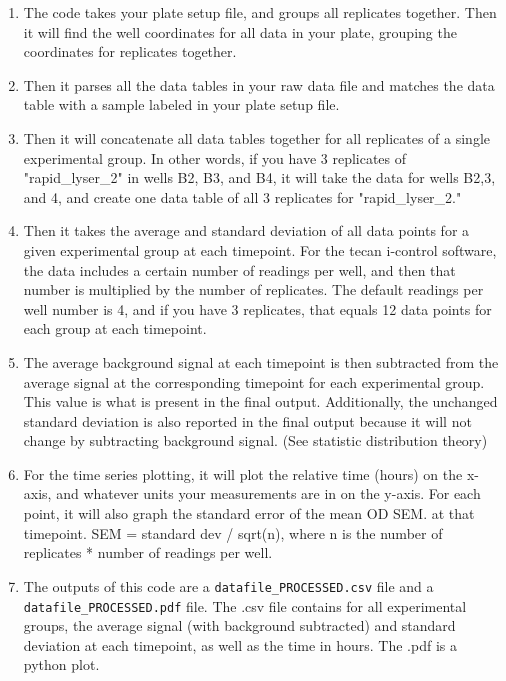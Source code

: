 \documentclass[12pt]{article}
\begin{document}
\begin{enumerate}
\item The code takes your plate setup file, and groups all replicates
together. Then it will find the well coordinates for all data in your
plate, grouping the coordinates for replicates together.

\item Then it parses all the data tables in your raw data file and matches
the data table with a sample labeled in your plate setup file.

\item Then it will concatenate all data tables together for all replicates
of a single experimental group. In other words, if you have 3
replicates of "rapid\_lyser\_2" in wells B2, B3, and B4, it will take
the data for wells B2,3, and 4, and create one data table of all 3
replicates for "rapid\_lyser\_2."

\item Then it takes the average and standard deviation of all data points
for a given experimental group at each timepoint. For the tecan
i-control software, the data includes a certain number of readings
per well, and then that number is multiplied by the number of
replicates. The default readings per well number is 4, and if you
have 3 replicates, that equals 12 data points for each group at each
timepoint.

\item The average background signal at each timepoint is then subtracted
from the average signal at the corresponding timepoint for each
experimental group. This value is what is present in the final
output. Additionally, the unchanged standard deviation is also
reported in the final output because it will not change by
subtracting background signal. (See statistic distribution theory)

\item For the time series plotting, it will plot the relative time (hours)
on the x-axis, and whatever units your measurements are in on the
y-axis. For each point, it will also graph the standard error of the
mean OD \textpm{} SEM. at that timepoint. SEM = standard dev / sqrt(n), where
n is the number of replicates * number of readings per well.

\item The outputs of this code are a \texttt{datafile\_PROCESSED.csv} file and a
\texttt{datafile\_PROCESSED.pdf} file. The .csv file contains for all
experimental groups, the average signal (with background subtracted)
and standard deviation at each timepoint, as well as the time in
hours. The .pdf is a python plot.
\end{enumerate}
\end{document}
